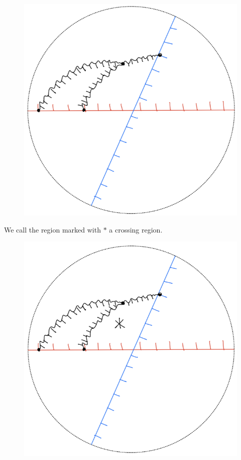 \begin{definition}
\begin{enumerate}[label = (\roman*)]
\begin{itemize}
\begin{figure}[H]
    \includegraphics[scale = 0.95]{diagrams/local_systems_on_as_diagrams/4.png} 
    \caption{}
    \label{fig:your-label}
\end{figure}
We call the region marked with $*$ a crossing region.
\begin{figure}[H] 
    \centering
    \includegraphics[scale = 0.95]{diagrams/local_systems_on_as_diagrams/5.png} 
    \caption{}
    \label{fig:your-label}
\end{figure}


\end{itemize}
\end{enumerate}
\end{definition}
